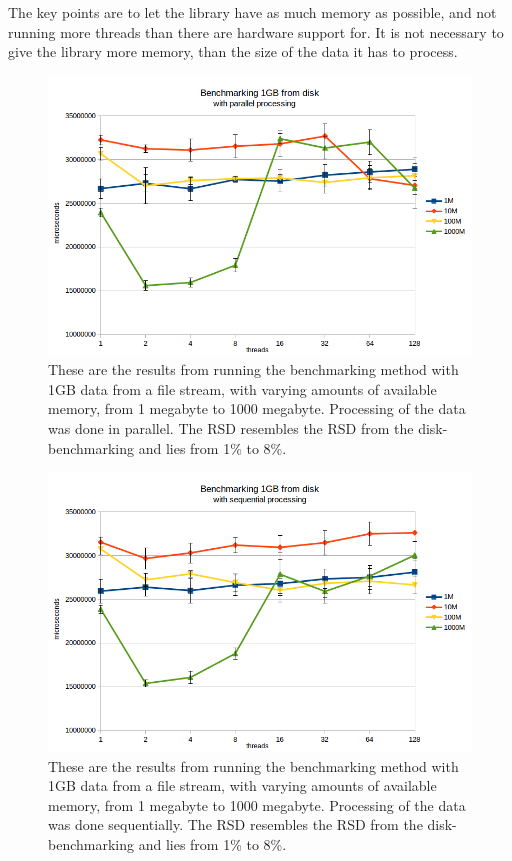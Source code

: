 \documentclass[a4paper]{article}
\begin{document}
The key points are to let the library have as much memory as possible, and not running more threads than there are hardware support for. It is not necessary to give the library more memory, than the size of the data it has to process.

\begin{figure}
	\begin{adjustwidth}{-0.5in}{-0.5in}
    \centering
     \includegraphics[scale=0.7]{../test_results/disk_par.png}
  	\caption{These are the results from running the benchmarking method with 1GB data from a file stream, with varying amounts of available memory, from 1 megabyte to 1000 megabyte. Processing of the data was done in parallel. The RSD resembles the RSD from the disk-benchmarking and lies from 1\% to 8\%.}
	\label{figure:disk-par}
	\end{adjustwidth}
\end{figure}

\begin{figure}
	\begin{adjustwidth}{-0.5in}{-0.5in}
    \centering
     \includegraphics[scale=0.7]{../test_results/disk_seq.png}
  	\caption{These are the results from running the benchmarking method with 1GB data from a file stream, with varying amounts of available memory, from 1 megabyte to 1000 megabyte. Processing of the data was done sequentially. The RSD resembles the RSD from the disk-benchmarking and lies from 1\% to 8\%.}
	\label{figure:disk-seq}
	\end{adjustwidth}
\end{figure}
\end{document}

